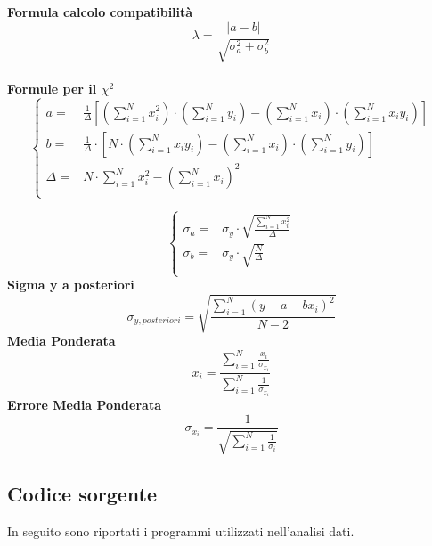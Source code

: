 \documentclass[a4paper,11pt,oneside]{article}
\begin{document}
\textbf{Formula calcolo compatibilità}\\
\begin{equation*}
    \lambda=\frac{\left|a-b\right|}{\sqrt{\sigma^{2}_{a}+\sigma^{2}_{b}}}
\end{equation*}\\

\textbf{Formule per il ${\chi}^2$}
\begin{equation*}
        \begin{cases}
    a=&\frac{1}{\Delta}[(\sum\limits_{i=1}^{N}{x_{i}^{2}})\cdot(\sum\limits_{i=1}^{N}{y_{i}})-(\sum\limits_{i=1}^{N}{x_{i}})\cdot(\sum\limits_{i=1}^{N}{x_{i}y_{i}})] \\ 
    b=&\frac{1}{\Delta }\cdot \left [N\cdot \left ( \sum\limits_{i=1}^{N}x_i y_i \right )-\left ( \sum\limits_{i=1}^{N}x_i \right )\cdot \left ( \sum\limits_{i=1}^{N}y_i \right )  \right ]\\
    \Delta=& N\cdot \sum\limits_{i=1}^{N} x_i^{2} - \left ( \sum\limits_{i=1}^{N}x_i \right )^{2}\\

    \end{cases}
\end{equation*}

\begin{equation*}
    \begin{cases}
    \sigma_{a}=&\sigma_{y}\cdot\sqrt{\frac{\sum_{i=1}^{N}{x_{i}^{2}}}{\Delta}} \\
    \sigma_{b}=&\sigma_y\cdot \sqrt{\frac{N}{\Delta }}\\
    \end{cases}
\end{equation*}
\textbf{Sigma y a posteriori}
\begin{equation*}\label{eq:y_posteriori}
    \sigma_{y, posteriori}=\sqrt{\frac{\sum_{i=1}^{N}(y-a-bx_{i})^{2}}{N-2}}
\end{equation*}
\textbf{Media Ponderata}
\begin{equation*}\label{eq:media_ponderata}
    x_i=\frac{\sum_{i=1}^{N}\frac{x_i}{\sigma_{x_i}}}{\sum_{i=1}^{N}\frac{1}{\sigma_{x_i}}}
\end{equation*}
\textbf{Errore Media Ponderata}\label{eq:errore_media_pond}
\begin{equation*}
     \sigma_x_i=\frac{1}{\sqrt{\sum_{i=1}^{N}\frac{1}{\sigma_i}}}
\end{equation*}
   

\subsection{Codice sorgente}
In seguito sono riportati i programmi utilizzati nell'analisi dati.
\end{document}
